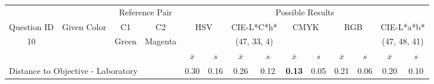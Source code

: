 \begin{table}[htbp]
  \resizebox{\textwidth}{!} {
  \begin{tabular}{lccccccccccccc}
    \hline
    \multicolumn{1}{c}{}                              &                                      & \multicolumn{2}{c}{Reference Pair}                   & \multicolumn{10}{c}{Possible Results}                                                                                                                                                                                                                                                                                        \\ \cline{3-14}
    \multicolumn{1}{c}{\multirow{-2}{*}{Question ID}} & \multirow{-2}{*}{Given Color}        & C1                       & C2                         & \multicolumn{2}{c}{HSV}                                        & \multicolumn{2}{c}{CIE-L*C*h*}                                 & \multicolumn{2}{c}{CMYK}                                       & \multicolumn{2}{c}{RGB}                                        & \multicolumn{2}{c}{CIE-L*a*b*}                                 \\ \hline
    \multicolumn{1}{c}{10}                             & \cellcolor[HTML]{0080FF}{\color[HTML]{FFFFFF}(26, 23, 98)} & \multicolumn{1}{c|}{Green} & \multicolumn{1}{c|}{Magenta}  & \multicolumn{2}{c|}{\cellcolor[HTML]{0080FF}{\color[HTML]{FFFFFF}(26, 23, 98)}}      & \multicolumn{2}{c|}{\cellcolor[HTML]{FF6F00}(47, 33, 4)}       & \multicolumn{2}{c|}{\cellcolor[HTML]{808080}{\color[HTML]{FFFFFF}(21, 22, 24)}}       & \multicolumn{2}{c|}{\cellcolor[HTML]{808080}{\color[HTML]{FFFFFF}(21, 22, 24)}}       & \multicolumn{2}{c|}{\cellcolor[HTML]{C9B2A2}(47, 48, 41)}       \\ \hline
                                                      & \multicolumn{1}{l}{}                 & \multicolumn{1}{l}{}     & \multicolumn{1}{l}{}       & \multicolumn{1}{c}{$\overline{x}$} & \multicolumn{1}{c}{$s$} & \multicolumn{1}{c}{$\overline{x}$} & \multicolumn{1}{c}{$s$} & \multicolumn{1}{c}{$\overline{x}$} & \multicolumn{1}{c}{$s$} & \multicolumn{1}{c}{$\overline{x}$} & \multicolumn{1}{c}{$s$} & \multicolumn{1}{c}{$\overline{x}$} & \multicolumn{1}{c}{$s$} \\ \hline
    \multicolumn{4}{l}{Distance to Objective - Laboratory}                                                                                           & \multicolumn{1}{|c}{0.30}       & \multicolumn{1}{c|}{0.16}    & \multicolumn{1}{|c}{0.26}       & \multicolumn{1}{c|}{0.12}    & \multicolumn{1}{|c}{\textbf{0.13}}       & \multicolumn{1}{c|}{0.05}    & \multicolumn{1}{|c}{0.21}       & \multicolumn{1}{c|}{0.06}    & \multicolumn{1}{|c}{0.20}       & \multicolumn{1}{c|}{0.10}    \\

\end{tabular}}
\end{table}

